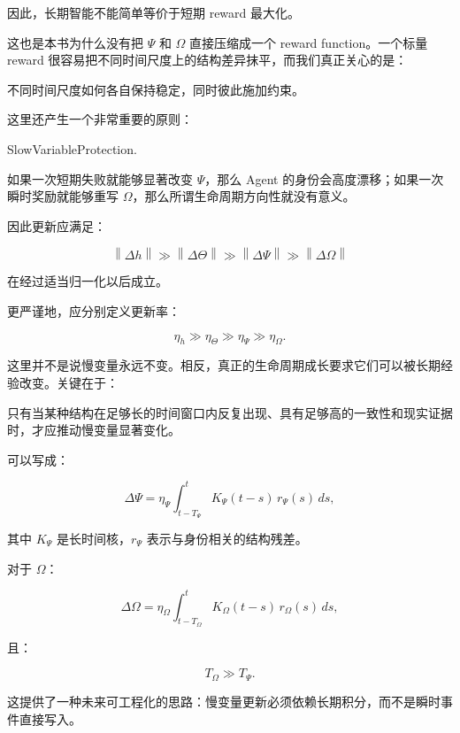 因此，长期智能不能简单等价于短期 reward 最大化。

这也是本书为什么没有把 $\Psi$ 和 $\Omega$ 直接压缩成一个 reward function。一个标量 reward 很容易把不同时间尺度上的结构差异抹平，而我们真正关心的是：

\begin{statementbox}
不同时间尺度如何各自保持稳定，同时彼此施加约束。
\end{statementbox}

这里还产生一个非常重要的原则：

\begin{statementbox}
SlowVariableProtection.
\end{statementbox}

如果一次短期失败就能够显著改变 $\Psi$，那么 Agent 的身份会高度漂移；如果一次瞬时奖励就能够重写 $\Omega$，那么所谓生命周期方向性就没有意义。

因此更新应满足：

\[
\left\|
\Delta h
\right\|
\gg
\left\|
\Delta\Theta
\right\|
\gg
\left\|
\Delta\Psi
\right\|
\gg
\left\|
\Delta\Omega
\right\|
\]

在经过适当归一化以后成立。

更严谨地，应分别定义更新率：

\[
\eta_h
\gg
\eta_\Theta
\gg
\eta_\Psi
\gg
\eta_\Omega.
\]

这里并不是说慢变量永远不变。相反，真正的生命周期成长要求它们可以被长期经验改变。关键在于：

\begin{statementbox}
\centering
{}
\end{statementbox}

只有当某种结构在足够长的时间窗口内反复出现、具有足够高的一致性和现实证据时，才应推动慢变量显著变化。

可以写成：

\[
\Delta\Psi
=
\eta_\Psi
\int_{t-T_\Psi}^{t}
K_\Psi(t-s)
\,r_\Psi(s)
\,ds,
\]

其中 $K_\Psi$ 是长时间核，$r_\Psi$ 表示与身份相关的结构残差。

对于 $\Omega$：

\[
\Delta\Omega
=
\eta_\Omega
\int_{t-T_\Omega}^{t}
K_\Omega(t-s)
\,r_\Omega(s)
\,ds,
\]

且：

\[
T_\Omega
\gg
T_\Psi.
\]

这提供了一种未来可工程化的思路：慢变量更新必须依赖长期积分，而不是瞬时事件直接写入。

